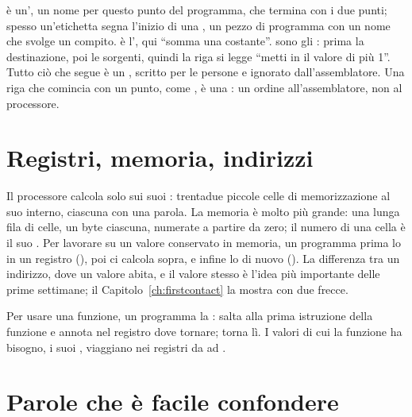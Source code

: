 \noindent {} è un', un nome per questo punto
del programma, che termina con i due punti; spesso un'etichetta segna l'inizio
di una , un pezzo di programma con un nome che svolge un
compito.  è l', qui ``somma una costante''.
 sono gli : prima la destinazione, poi le
sorgenti, quindi la riga si legge ``metti in  il valore di 
più 1''. Tutto ciò che segue \code{\#} è un , scritto per le
persone e ignorato dall'assemblatore. Una riga che comincia con un punto, come
, è una : un ordine all'assemblatore, non
al processore.

\section*{Registri, memoria, indirizzi}

Il processore calcola solo sui suoi : trentadue piccole celle di
memorizzazione al suo interno, ciascuna con una parola. La memoria è molto più
grande: una lunga fila di celle, un byte ciascuna, numerate a partire da zero;
il numero di una cella è il suo . Per lavorare su un valore
conservato in memoria, un programma prima lo  in un registro
(), poi ci calcola sopra, e infine lo  di nuovo
(). La differenza tra un indirizzo, dove un valore abita, e il valore
stesso è l'idea più importante delle prime settimane; il
Capitolo~\ref{ch:firstcontact} la mostra con due frecce.

Per usare una funzione, un programma la :  salta alla
prima istruzione della funzione e annota nel registro  dove tornare;
 torna lì. I valori di cui la funzione ha bisogno, i suoi
, viaggiano nei registri da  ad .

\section*{Parole che è facile confondere}

